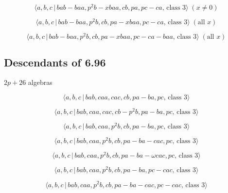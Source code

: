 \documentclass[10pt]{article}
\begin{document}
\begin{equation}
\langle a,b,c\,|\,bab-baa,p^2b-xbaa,cb,pa,pc-ca,\,\text{class }3\rangle \;(x
\neq 0)  \tag{7.2876}
\end{equation}

\begin{equation}
\langle a,b,c\,|\,bab-baa,p^2b,cb,pa-xbaa,pc-ca,\,\text{class }3\rangle \;(%
\text{all }x)  \tag{7.2877}
\end{equation}

\begin{equation}
\langle a,b,c\,|\,bab-baa,p^2b,cb,pa-xbaa,pc-ca-baa,\,\text{class }3\rangle
\;(\text{all }x)  \tag{7.2878}
\end{equation}

\subsection{Descendants of 6.96}

$2p+26$ algebras

\begin{equation}
\langle a,b,c\,|\,bab,caa,cac,cb,pa-ba,pc,\,\text{class }3\rangle 
\tag{7.2879}
\end{equation}

\begin{equation}
\langle a,b,c\,|\,bab,caa,cac,cb-p^2b,pa-ba,pc,\,\text{class }3\rangle 
\tag{7.2880}
\end{equation}

\begin{equation}
\langle a,b,c\,|\,bab,caa,p^2b,cb,pa-ba,pc,\,\text{class }3\rangle 
\tag{7.2881}
\end{equation}

\begin{equation}
\langle a,b,c\,|\,bab,caa,p^2b,cb,pa-ba-cac,pc,\,\text{class }3\rangle 
\tag{7.2882}
\end{equation}

\begin{equation}
\langle a,b,c\,|\,bab,caa,p^{2}b,cb,pa-ba-\omega cac,pc,\,\text{class }%
3\rangle  \tag{7.2883}
\end{equation}

\begin{equation}
\langle a,b,c\,|\,bab,caa,p^2b,cb,pa-ba,pc-cac,\,\text{class }3\rangle 
\tag{7.2884}
\end{equation}

\begin{equation}
\langle a,b,c\,|\,bab,caa,p^2b,cb,pa-ba-cac,pc-cac,\,\text{class }3\rangle 
\tag{7.2885}
\end{equation}
\end{document}
